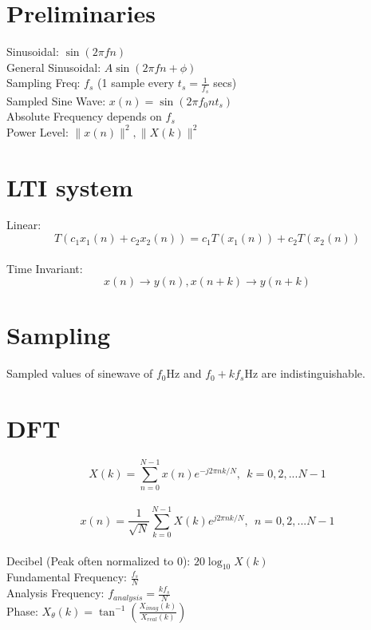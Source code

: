 \documentclass[11pt,twocolumn]{article}
\begin{document}
\section*{Preliminaries}
  Sinusoidal:  $\sin(2\pi f n)$ \\
  General Sinusoidal: $ A \sin(2\pi f n + \phi) $ \\
  Sampling Freq: $f_s$  (1 sample every $t_s =\frac{1}{f_s}$ secs) \\
  Sampled Sine Wave: $x(n) = \sin(2\pi f_0 nt_s)$ \\
  Absolute Frequency depends on $f_s$ \\
  Power Level: $\|x(n)\|^2,  \|X(k)\|^2$ 
  
\section*{LTI system}
  Linear:
  $$T(c_1x_1(n)+c_2x_2(n)) = c_1T(x_1(n)) + c_2 T(x_2(n))$$ \\
  Time Invariant:
  $$ x(n) \rightarrow y(n), x(n+k) \rightarrow y(n+k) $$
 
\section*{Sampling}
	Sampled values of sinewave of $f_0$Hz and $f_0+kf_s$Hz are indistinguishable. 
\section*{DFT}
  $$X(k) = \sum^{N-1}_{n=0} x(n)e^{-j2\pi nk/N}, \ \ k = 0,2,...N-1 $$ \\
  $$x(n) = \frac{1}{\sqrt{N}} \sum^{N-1}_{k=0} X(k)e^{j2\pi nk/N}, \ \ n = 0,2,...N-1$$ \\
  
Decibel (Peak often normalized to 0): $20 \log_{10}{X(k)}$ \\
Fundamental Frequency: $\frac{f_s}{N}$ \\
Analysis Frequency: $f_{analysis} = \frac{kf_s}{N}$ \\
Phase: $X_{\theta}(k) = \tan^{-1}\left(\frac{X_{imag}(k)}{X_{real}(k)}\right)$ \\
\end{document}

